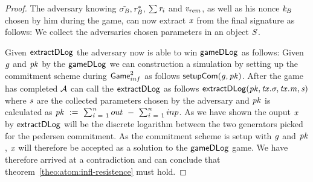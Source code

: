 \begin{proof}
    The adversary knowing $\tilde{\sigma_{\mathit{B}}}, \mathit{r}_{\mathit{B}}^*$, $\sum \mathit{r}_i$ and $\mathit{v_{rem}}$, as well as his nonce $\mathit{\mathit{k}_{\mathit{B}}}$ chosen by him during the game, can now extract $\mathit{x}$ from the final signature as follows:
    We collect the adversaries chosen parameters in an object $\mathit{S}$.
    \begin{center}
    \end{center}

    Given $\mathsf{extractDLog}$ the adversary now is able to win $\mathsf{gameDLog}$ as follows:
    Given $\mathit{g}$ and $\mathit{pk}$ by the $\mathsf{gameDLog}$ we can construction a simulation by setting up the commitment scheme during $\mathsf{Game}_{inf}^{2}$ as follows $\mathsf{setupCom} (\mathit{g},\mathit{pk})$.
    After the game has completed $\mathcal{A}$ can call the $\mathsf{extractDLog}$ as follows $\mathsf{extractDLog}(\mathit{pk},\mathit{tx}.\sigma,\mathit{tx}.\mathit{m},\mathit{s})$ where $\mathit{s}$ are the collected parameters chosen by the adversary and $\mathit{pk}$ is calculated as $\mathit{pk} ~:=~ \sum_{\mathit{i} ~=~ 1}^{\mathit{n}} out ~-~ \sum_{\mathit{i} ~=~ 1}^{\mathit{n}} inp$.
    As we have shown the ouput $\mathit{x}$ by $\mathsf{extractDLog}$ will be the discrete logarithm between the two generators picked for the pedersen commitment.
    As the commitment scheme is setup with $\mathit{g}$ and $\mathit{pk}$, $\mathit{x}$ will therefore be accepted as a solution to the $\mathsf{gameDLog}$ game.
    We have therefore arrived at a contradiction and can conclude that theorem~\ref{theo:atom:infl-resistence} must hold.
\end{proof}

